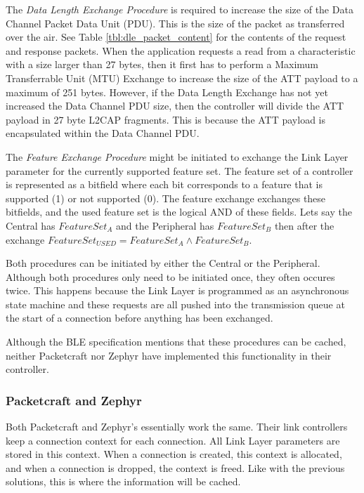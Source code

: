 The \textit{Data Length Exchange Procedure} is required to increase the size of the Data Channel Packet Data Unit (PDU). This is the size of the packet as transferred over the air. See Table \ref{tbl:dle_packet_content} for the contents of the request and response packets. When the application requests a read from a characteristic with a size larger than 27 bytes, then it first has to perform a Maximum Transferrable Unit (MTU) Exchange to increase the size of the ATT payload to a maximum of 251 bytes. However, if the Data Length Exchange has not yet increased the Data Channel PDU size, then the controller will divide the ATT payload in 27 byte L2CAP fragments. This is because the ATT payload is encapsulated within the Data Channel PDU.

The \textit{Feature Exchange Procedure} might be initiated to exchange the Link Layer parameter for the currently supported feature set. The feature set of a controller is represented as a bitfield where each bit corresponds to a feature that is supported (1) or not supported (0). The feature exchange exchanges these bitfields, and the used feature set is the logical AND of these fields. Lets say the Central has $FeatureSet_A$ and the Peripheral has $FeatureSet_B$ then after the exchange $FeatureSet_{USED} = FeatureSet_A \land FeatureSet_B$.

Both procedures can be initiated by either the Central or the Peripheral. Although both procedures only need to be initiated once, they often occures twice. This happens because the Link Layer is programmed as an asynchronous state machine and these requests are all pushed into the transmission queue at the start of a connection before anything has been exchanged.

Although the BLE specification mentions that these procedures can be cached, neither Packetcraft nor Zephyr have implemented this functionality in their controller. 

\subsubsection{Packetcraft and Zephyr}
Both Packetcraft and Zephyr's essentially work the same. Their link controllers keep a connection context for each connection. All Link Layer parameters are stored in this context. When a connection is created, this context is allocated, and when a connection is dropped, the context is freed. Like with the previous solutions, this is where the information will be cached.

